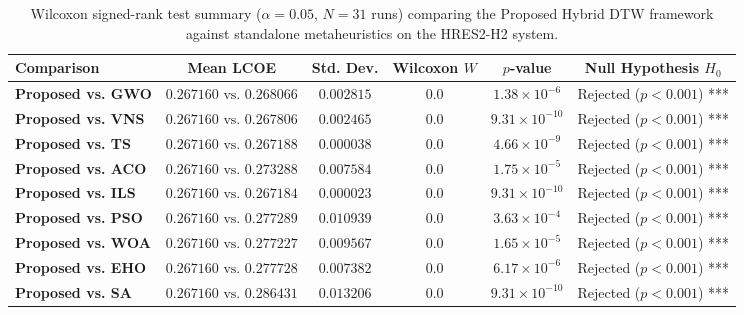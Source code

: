 \begin{table}[htbp]
\centering
\caption{Wilcoxon signed-rank test summary ($\alpha = 0.05$, $N=31$ runs) comparing the Proposed Hybrid DTW framework against standalone metaheuristics on the HRES2-H2 system.}
\label{tab:wilcoxon_results}
\begin{tabular}{lccccc}
\toprule
\textbf{Comparison} & \textbf{Mean LCOE} & \textbf{Std. Dev.} & \textbf{Wilcoxon $W$} & \textbf{$p$-value} & \textbf{Null Hypothesis $H_0$} \\
\midrule
\textbf{Proposed vs. GWO} & $0.267160 \text{ vs. } 0.268066$ & $0.002815$ & $0.0$ & $1.38 \times 10^{-6}$ & Rejected ($p < 0.001$) *** \\
\textbf{Proposed vs. VNS} & $0.267160 \text{ vs. } 0.267806$ & $0.002465$ & $0.0$ & $9.31 \times 10^{-10}$ & Rejected ($p < 0.001$) *** \\
\textbf{Proposed vs. TS} & $0.267160 \text{ vs. } 0.267188$ & $0.000038$ & $0.0$ & $4.66 \times 10^{-9}$ & Rejected ($p < 0.001$) *** \\
\textbf{Proposed vs. ACO} & $0.267160 \text{ vs. } 0.273288$ & $0.007584$ & $0.0$ & $1.75 \times 10^{-5}$ & Rejected ($p < 0.001$) *** \\
\textbf{Proposed vs. ILS} & $0.267160 \text{ vs. } 0.267184$ & $0.000023$ & $0.0$ & $9.31 \times 10^{-10}$ & Rejected ($p < 0.001$) *** \\
\textbf{Proposed vs. PSO} & $0.267160 \text{ vs. } 0.277289$ & $0.010939$ & $0.0$ & $3.63 \times 10^{-4}$ & Rejected ($p < 0.001$) *** \\
\textbf{Proposed vs. WOA} & $0.267160 \text{ vs. } 0.277227$ & $0.009567$ & $0.0$ & $1.65 \times 10^{-5}$ & Rejected ($p < 0.001$) *** \\
\textbf{Proposed vs. EHO} & $0.267160 \text{ vs. } 0.277728$ & $0.007382$ & $0.0$ & $6.17 \times 10^{-6}$ & Rejected ($p < 0.001$) *** \\
\textbf{Proposed vs. SA} & $0.267160 \text{ vs. } 0.286431$ & $0.013206$ & $0.0$ & $9.31 \times 10^{-10}$ & Rejected ($p < 0.001$) *** \\
\bottomrule
\end{tabular}
\end{table}

